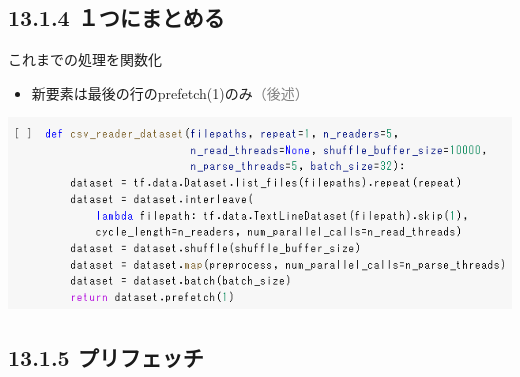 \documentclass[aspectratio=169, dvipdfmx, 14pt, xcolor={svgnames,dvipsnames}, t]{beamer}
\begin{document}

\hypertarget{ux3064ux306bux307eux3068ux3081ux308b}{%
  \subsection{13.1.4 １つにまとめる}\label{ux3064ux306bux307eux3068ux3081ux308b}}


\begin{frame}{これまでの処理を関数化}

  \begin{itemize}
    \tightlist
    \item
          新要素は最後の行のprefetch(1)のみ\textcolor{gray}{（後述）}
  \end{itemize}

  \centering
  \includegraphics[width=400pt]{img/hands-on-ml_13-1-4_1.png}

\end{frame}


\hypertarget{ux30d7ux30eaux30d5ux30a7ux30c3ux30c1}{%
  \subsection{13.1.5 プリフェッチ}\label{ux30d7ux30eaux30d5ux30a7ux30c3ux30c1}}

\end{document}

